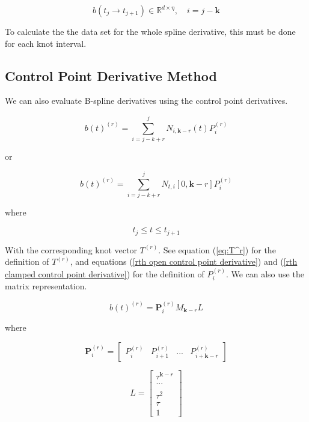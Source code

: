 \documentclass{article}
\begin{document}
\begin{equation}
    b(t_j \rightarrow t_{j+1}) \in \mathbb{R}^{d \times \eta}, \quad i = j-\textbf{k}
\end{equation}
    
To calculate the the data set for the whole spline derivative, this must be done for each knot interval.

\subsection{Control Point Derivative Method}

We can also evaluate B-spline derivatives using the control point derivatives.

\begin{equation}
    b(t)^{(r)} = \sum^{j}_{i=j-k+r} N_{i,\textbf{k}-r}(t) P_i^{(r)}
\end{equation}
  
 or 
 
   \begin{equation}
    b(t)^{(r)} = \sum^{j}_{i=j-k+r} N_{t,i}[0,\textbf{k}-r] P_i^{(r)}
\end{equation}

where 

\begin{equation}
  t_{j} \leq t \le t_{j+1}
\end{equation}
  
  With the corresponding knot vector \(T^{(r)}\). See equation (\ref{eq:T^r}) for the definition of \(T^{(r)}\), and equations (\ref{rth open control point derivative}) and (\ref{rth clamped control point derivative}) for the definition of \(P_i^{(r)}\). We can also use the matrix representation.

   \begin{equation}
        b(t)^{(r)} = \textbf{P}_i^{(r)}  M_{\textbf{k}-r} L
    \end{equation}

        where
        
    \begin{equation}
        \textbf{P}_i^{(r)} = \begin{bmatrix} P_{i}^{(r)} & P_{i+1}^{(r)} & ... & P_{i+\textbf{k}-r}^{(r)}\end{bmatrix}
    \end{equation}
    
    \begin{equation}
        L = \begin{bmatrix} \tau^{\textbf{k}-r} \\ ... \\ \\ \tau^2 \\ \tau \\ 1 \end{bmatrix}
    \end{equation}
    
\end{document}
